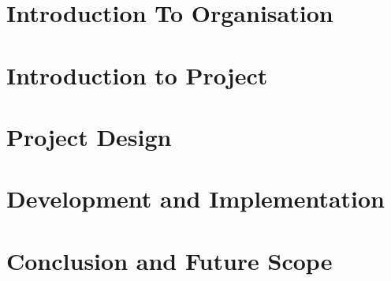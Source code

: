 \documentclass[12pt,includeheadfoot,a4paper]{report}
\begin{document}


\thispagestyle{empty}
\pagetitle
\newpage
{}
\cfoot{\thepage}



\newpage


\newpage
\tableofcontents
\newpage
\listoffigures
\newpage
\listoftables
\newpage


\cfoot{\thepage}


\newpage

\chapter{Introduction To Organisation}


\newpage

\chapter{Introduction to Project}



\chapter{Project Design}






%

\chapter{Development and Implementation}







\chapter{Conclusion and Future Scope}





\end{document}
